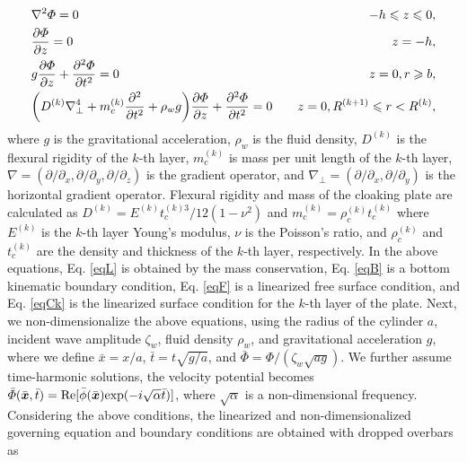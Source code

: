 \documentclass{jfm}
\begin{document}
\begin{eqnarray}%
\vspace{1mm}
& \displaystyle \nabla^2\Phi=0 & -h\le z\le 0, \label{eqL}\\%
\vspace{1mm}
& \displaystyle \frac{\partial \Phi}{\partial z}=0 & z=-h, \label{eqB}\\%
\vspace{1mm}%
& \displaystyle g\frac{\partial \Phi}{\partial z}+ \frac{\partial^2 \Phi}{\partial t^2}=0 & z=0, r\ge b, \label{eqF}\\%
& \displaystyle \bigg(D^{(k)}\nabla_\perp^4+m_c^{(k)}\frac{\partial^2}{\partial t^2}+\rho_w g\bigg)\frac{\partial \Phi}{\partial z}+\frac{\partial ^2 \Phi}{\partial t^2}=0 \quad & z=0, R^{(k+1)}\le r < R^{(k)},\label{eqCk}%
\end{eqnarray}%
where $g$ is the gravitational acceleration, $\rho_w$ is the fluid density, $D^{(k)}$ is the flexural rigidity of the $k$-th layer, $m_c^{(k)}$ is mass per unit length of the $k$-th layer, $\nabla=(\partial/\partial_x, \partial/\partial_y, \partial/\partial_z)$ is the gradient operator, and  $\nabla_\perp = (\partial/\partial_x, \partial/\partial_y)$ is the horizontal gradient operator.  Flexural rigidity and mass of the cloaking plate are calculated as $D^{(k)}=E^{(k)}t_c^{(k)3}/12(1-\nu^2)$ and $m_c^{(k)}=\rho_c^{(k)} t_c^{(k)}$ where $E^{(k)}$ is the $k$-th layer Young's modulus, $\nu$ is the Poisson's ratio, and $\rho_c^{(k)}$ and $t_c^{(k)}$ are the density and thickness of the $k$-th layer, respectively. In the above equations, Eq. \eqref{eqL} is obtained by the mass conservation, Eq. \eqref{eqB} is a bottom kinematic boundary condition, Eq. \eqref{eqF} is a linearized free surface condition, and Eq. \eqref{eqCk} is the linearized surface condition for the $k$-th layer of the plate. Next, we non-dimensionalize the above equations, using the radius of the cylinder $a$, incident wave amplitude $\zeta_w$, fluid density $\rho_w$, and gravitational acceleration $g$, where we define $\bar{x}=x/a$, $\bar{t}=t\sqrt{g/a}$, and $\bar{\Phi}=\Phi/(\zeta_w\sqrt{ag})$.
We further assume time-harmonic solutions, the velocity potential becomes $\bar{\Phi}(\bar{\mbox{\boldmath $x$}}, \bar{t})={\rm Re}[\bar{\phi}(\bar{\mbox{\boldmath $x$}}){\rm exp}(-i\sqrt{\alpha}\bar{t})]$, where $\sqrt{\alpha}$ is a non-dimensional frequency. Considering the above conditions, the linearized and non-dimensionalized governing equation and boundary conditions are obtained  \cite[e.g.][]{Meylan2002} with dropped overbars as
\end{document}
